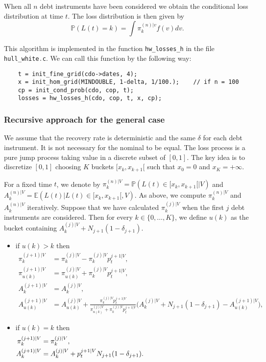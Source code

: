 \documentclass[10pt, a4paper]{article}
\newcommand{\code}[1]{{\upshape \lstinline[language=c]{#1}}}
\newcommand{\E}{\mathbb{E}}
\renewcommand{\P}{\mathbb{P}}
\begin{document}
When all $n$ debt instruments have been considered we obtain the conditional loss distribution at time $t$. The loss distribution is then given by 
\begin{equation*}
    \P(L(t) = k) = \int \pi^{(n)|v}_k f(v) d v.
\end{equation*}

This algorithm is implemented in the function \code{hw_losses_h} in the file \code{hull_white.c}. We can call this function by the following way: 
\begin{lstlisting}
    t = init_fine_grid(cdo->dates, 4);
    x = init_hom_grid(MINDOUBLE, 1-delta, 1/100.);    // if n = 100
    cp = init_cond_prob(cdo, cop, t);
    losses = hw_losses_h(cdo, cop, t, x, cp);
\end{lstlisting}

\subsubsection*{Recursive approach for the general case}
We assume that the recovery rate is deterministic and the same $\delta$ for each debt instrument. It is not necessary for the nominal to be equal. The loss process is a pure jump process taking value in a discrete subset of $[0,1]$. The key idea is to discretize $[0,1]$ choosing $K$ buckets $[x_k, x_{k+1}[$ such that $x_0 = 0$ and $x_K = +\infty$. 

For a fixed time $t$, we denote by $\pi^{(n)|V}_k = \P(L(t) \in [x_k, x_{k+1}[ | V)$ and $A^{(n)|V}_k = \E(L(t) | L(t) \in [x_k, x_{k+1}[, V)$. As above, we compute $\pi^{(n)|V}_k$ and $A^{(n)|V}_k$ iteratively. 
Suppose that we have calculated $\pi^{(j)|V}_k$ when the first $j$ debt instruments are considered. Then for every $k \in \{0, \dots, K\}$, we define $u(k)$ as the bucket containing $A^{(j)|V}_k + N_{j+1} (1-\delta_{j+1})$. 
\begin{itemize}
\item if $u(k) > k$ then 
\begin{align*}
    \pi^{(j+1)|V}_k &= \pi^{(j)|V}_k - \pi^{(j)|V}_k p^{j+1|V}_t, \\  
    \pi^{(j+1)|V}_{u(k)} &= \pi^{(j)|V}_{u(k)} + \pi^{(j)|V}_k p^{j+1|V}_t, \\
    A^{(j+1)|V}_k &= A^{(j)|V}_k, \\ 
    A^{(j+1)|V}_{u(k)} &= A^{(j)|V}_{u(k)} + \frac{\pi^{(j)|V}_k p^{j+1|V}_t}{\pi^{(j)|V}_{u(k)} + \pi^{(j)|V}_k p^{j+1|V}_t} \bigl(A^{(j)|V}_k + N_{j+1} (1-\delta_{j+1}) - A^{(j+1)|V}_{u(k)} \bigr), 
\end{align*}
\item if $u(k) = k$ then 
\begin{align*}
    \pi^{(j+1)|V}_k &= \pi^{(j)|V}_k, \\  
    A^{(j+1)|V}_k &= A^{(j)|V}_k + p^{j+1|V}_t N_{j+1} (1-\delta_{j+1}). \\ 
    \hphantom{A^{(j+1)|V}_{u(k)} }&\hphantom{= A^{(j)|V}_{u(k)} + \frac{\pi^{(j)|V}_k p^{j+1|V}_t}{\pi^{(j)|V}_{u(k)} + \pi^{(j)|V}_k p^{j+1|V}_t} \bigl(A^{(j)|V}_k + N_{j+1} (1-\delta_{j+1}) - A^{(j+1)|V}_{u(k)} \bigr),}
\end{align*}
\end{itemize}
\end{document}
